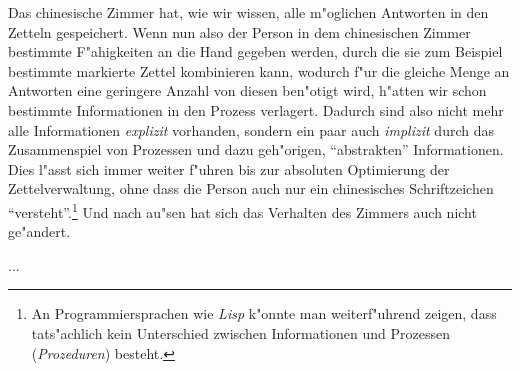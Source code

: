 \documentclass[a4paper, emulatestandardclasses, 12pt]{scrartcl}
\begin{document}
\begin{onehalfspace}
Das chinesische Zimmer hat, wie wir wissen, alle m"oglichen Antworten in den Zetteln gespeichert. Wenn nun also der Person in dem chinesischen Zimmer bestimmte F"ahigkeiten an die Hand gegeben werden, durch die sie zum Beispiel bestimmte markierte Zettel kombinieren kann, wodurch f"ur die gleiche Menge an Antworten eine geringere Anzahl von diesen ben"otigt wird, h"atten wir schon bestimmte Informationen in den Prozess verlagert. Dadurch sind also nicht mehr alle Informationen \emph{explizit} vorhanden, sondern ein paar auch \emph{implizit} durch das Zusammenspiel von Prozessen und dazu geh"origen, "`abstrakten"' Informationen. Dies l"asst sich immer weiter f"uhren bis zur absoluten Optimierung der Zettelverwaltung, ohne dass die Person auch nur ein chinesisches Schriftzeichen "`versteht"'.\footnote{An Programmiersprachen wie \emph{Lisp} k"onnte man weiterf"uhrend zeigen, dass tats"achlich kein Unterschied zwischen Informationen und Prozessen (\emph{Prozeduren}) besteht.} Und nach au"sen hat sich das Verhalten des Zimmers auch nicht ge"andert.


...



 
 

\noindent 



\end{onehalfspace}
\end{document}
